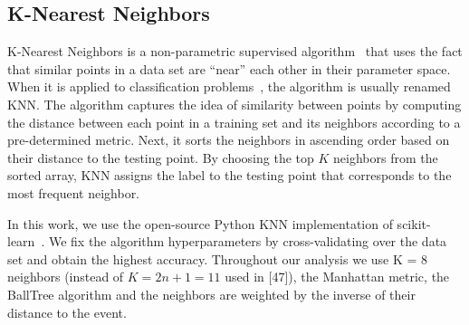 \subsection*{K-Nearest Neighbors}

K-Nearest Neighbors is a non-parametric supervised algorithm~\cite{Fix:1951,Cover:1967} that uses the fact that similar points in a data set are ``near'' each other in their
parameter space. When it is applied to classification problems~\cite{Guo:2004}, the algorithm is usually renamed \ac{KNN}. The algorithm captures the idea of similarity between
points by computing the distance between each point in a training set and its neighbors according to a pre-determined metric. Next, it sorts the neighbors in ascending order based on
their distance to the testing point. By choosing the top $K$ neighbors from the sorted array, \ac{KNN} assigns the label to the testing point that corresponds to the most
frequent neighbor.

In this work, we use the open-source Python \ac{KNN} implementation of scikit-learn~\cite{Pedregosa:2011ork}. We fix the algorithm hyperparameters by cross-validating over the data set and obtain the highest accuracy. Throughout our analysis we use K = 8 neighbors (instead of $K = 2n + 1 = 11$ used in [47]), the Manhattan metric, the BallTree algorithm and the neighbors are weighted by the inverse of their distance to the event.






